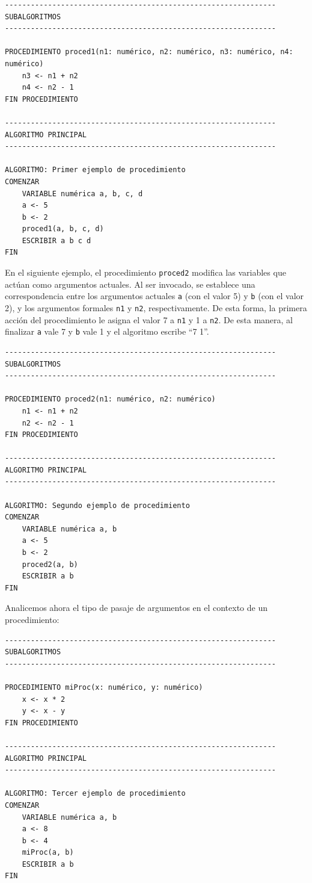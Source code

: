 \documentclass[
]{book}
\begin{document}
\begin{verbatim}
---------------------------------------------------------------
SUBALGORITMOS
---------------------------------------------------------------

PROCEDIMIENTO proced1(n1: numérico, n2: numérico, n3: numérico, n4: numérico)
    n3 <- n1 + n2
    n4 <- n2 - 1
FIN PROCEDIMIENTO

---------------------------------------------------------------
ALGORITMO PRINCIPAL
---------------------------------------------------------------

ALGORITMO: Primer ejemplo de procedimiento
COMENZAR
    VARIABLE numérica a, b, c, d
    a <- 5
    b <- 2
    proced1(a, b, c, d)
    ESCRIBIR a b c d
FIN
\end{verbatim}

En el siguiente ejemplo, el procedimiento \texttt{proced2} modifica las variables que actúan como argumentos actuales. Al ser invocado, se establece una correspondencia entre los argumentos actuales \texttt{a} (con el valor 5) y \texttt{b} (con el valor 2), y los argumentos formales \texttt{n1} y \texttt{n2}, respectivamente. De esta forma, la primera acción del procedimiento le asigna el valor 7 a \texttt{n1} y 1 a \texttt{n2}. De esta manera, al finalizar \texttt{a} vale 7 y \texttt{b} vale 1 y el algoritmo escribe ``7 1''.

\begin{verbatim}
---------------------------------------------------------------
SUBALGORITMOS
---------------------------------------------------------------

PROCEDIMIENTO proced2(n1: numérico, n2: numérico)
    n1 <- n1 + n2
    n2 <- n2 - 1
FIN PROCEDIMIENTO

---------------------------------------------------------------
ALGORITMO PRINCIPAL
---------------------------------------------------------------

ALGORITMO: Segundo ejemplo de procedimiento
COMENZAR
    VARIABLE numérica a, b
    a <- 5
    b <- 2
    proced2(a, b)
    ESCRIBIR a b
FIN
\end{verbatim}

Analicemos ahora el tipo de pasaje de argumentos en el contexto de un procedimiento:

\begin{verbatim}
---------------------------------------------------------------
SUBALGORITMOS
---------------------------------------------------------------

PROCEDIMIENTO miProc(x: numérico, y: numérico)
    x <- x * 2
    y <- x - y
FIN PROCEDIMIENTO

---------------------------------------------------------------
ALGORITMO PRINCIPAL
---------------------------------------------------------------

ALGORITMO: Tercer ejemplo de procedimiento
COMENZAR
    VARIABLE numérica a, b
    a <- 8
    b <- 4
    miProc(a, b)
    ESCRIBIR a b
FIN
\end{verbatim}
\end{document}
